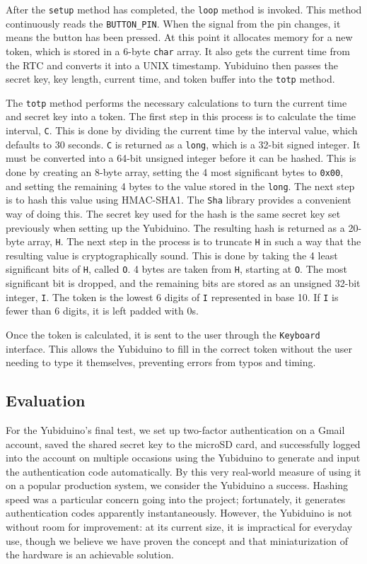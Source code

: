 \documentclass[conference]{IEEEtran}
\begin{document}
After the \texttt{setup} method has completed, the \texttt{loop} method is
invoked.  This method continuously reads the \texttt{BUTTON\_PIN}.  When the
signal from the pin changes, it means the button has been pressed.  At this
point it allocates memory for a new token, which is stored in a 6-byte \texttt{char}
array.  It also gets the current time from the RTC and converts it into a UNIX
timestamp.  Yubiduino then passes the secret key, key length, current time, and
token buffer into the \texttt{totp} method.

The \texttt{totp} method performs the necessary calculations to turn the
current time and secret key into a token.  The first step in this process is to
calculate the time interval, \texttt{C}.  This is done by dividing the current
time by the interval value, which defaults to 30 seconds. \texttt{C} is
returned as a \texttt{long}, which is a 32-bit signed integer.  It must be
converted into a 64-bit unsigned integer before it can be hashed.  This is done
by creating an 8-byte array, setting the 4 most significant bytes to
\texttt{0x00}, and setting the remaining 4 bytes to the value stored in the
\texttt{long}.  The next step is to hash this value using HMAC-SHA1.  The
\texttt{Sha} library provides a convenient way of doing this.  The secret key
used for the hash is the same secret key set previously when setting up the
Yubiduino.  The resulting hash is returned as a 20-byte array, \texttt{H}.  The
next step in the process is to truncate \texttt{H} in such a way that the
resulting value is cryptographically sound. This is done by taking the 4 least
significant bits of \texttt{H}, called \texttt{O}.  4 bytes are taken from
\texttt{H}, starting at \texttt{O}.  The most significant bit is dropped, and
the remaining bits are stored as an unsigned 32-bit integer, \texttt{I}.  The
token is the lowest 6 digits of \texttt{I} represented in base 10.  If
\texttt{I} is fewer than 6 digits, it is left padded with 0s.

Once the token is calculated, it is sent to the user through the
\texttt{Keyboard} interface.  This allows the Yubiduino to fill in the correct
token without the user needing to type it themselves, preventing errors from
typos and timing.


\subsection{Evaluation}
For the Yubiduino's final test, we set up two-factor authentication on a Gmail account, saved the shared secret key to the microSD card, and successfully logged into the account on multiple occasions using the Yubiduino to generate and input the authentication code automatically. By this very real-world measure of using it on a popular production system, we consider the Yubiduino a success. Hashing speed was a particular concern going into the project; fortunately, it generates authentication codes apparently instantaneously. However, the Yubiduino is not without room for improvement: at its current size, it is impractical for everyday use, though we believe we have proven the concept and that miniaturization of the hardware is an achievable solution.
\end{document}
